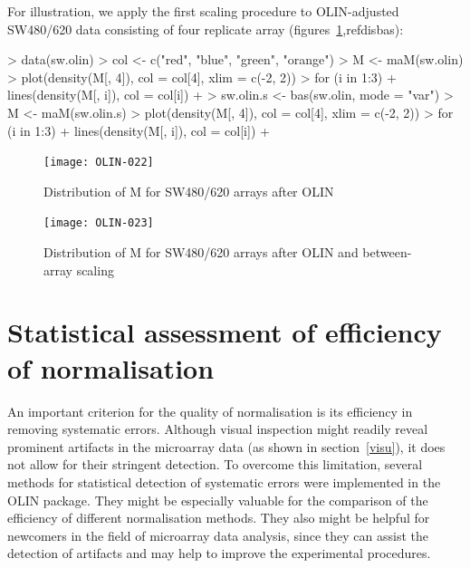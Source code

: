 \documentclass[a4paper,11pt]{article}
\begin{document}
For illustration, we apply the first scaling procedure to  OLIN-adjusted SW480/620 data consisting of four
replicate array (figures~\ref{disolin},ref{disbas}):

 
\begin{Schunk}
\begin{Sinput}
> data(sw.olin)
> col <- c("red", "blue", "green", "orange")
> M <- maM(sw.olin)
> plot(density(M[, 4]), col = col[4], xlim = c(-2, 2))
> for (i in 1:3) {
+     lines(density(M[, i]), col = col[i])
+ }
> sw.olin.s <- bas(sw.olin, mode = "var")
> M <- maM(sw.olin.s)
> plot(density(M[, 4]), col = col[4], xlim = c(-2, 2))
> for (i in 1:3) {
+     lines(density(M[, i]), col = col[i])
+ }
\end{Sinput}
\end{Schunk}



\begin{figure}[t]
\centering
\texttt{[image: OLIN-022]}
\caption{Distribution of M for SW480/620 arrays after OLIN  }
\label{disolin}
\end{figure}


\begin{figure}[t]
\centering
\texttt{[image: OLIN-023]}
\caption{Distribution of M for SW480/620 arrays after OLIN and between-array scaling}
\label{disbas}
\end{figure}




 


\section{Statistical assessment of efficiency of normalisation}
\label{stats}
An important criterion for the quality of normalisation is its efficiency in 
removing systematic errors. Although visual inspection might readily reveal prominent
artifacts in the microarray data (as shown in section~\ref{visu}), it does not allow for their stringent 
detection. To overcome this limitation, several methods for statistical detection of 
systematic errors were implemented in the OLIN package. They might be especially valuable
for the comparison of the efficiency of different normalisation methods. They also might 
be helpful for newcomers in the field of microarray data analysis, since they can assist the
detection of artifacts and may help to improve the experimental procedures.
\end{document}
